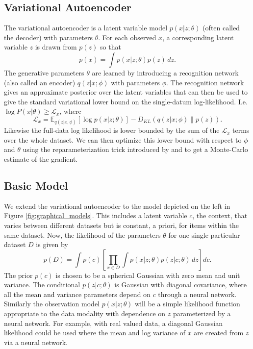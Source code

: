 \documentclass{article} \usepackage{iclr2017_conference,times}
\newcommand{\KL}[2]{D_{KL} \left (#1 \| #2 \right )}
\begin{document}
\subsection{Variational Autoencoder}
The variational autoencoder is a latent variable model $p(x|z;\theta)$ (often called the decoder) with parameters $\theta$. For each observed $x$, a corresponding latent variable $z$ is drawn from $p(z)$ so that
\begin{equation}
    p(x) = \int p(x|z ; \theta) p(z) \, dz .
\end{equation}
The generative parameters $\theta$ are learned by introducing a recognition network (also called an encoder) $q(z | x ;\phi)$ with parameters $\phi$. The recognition network gives an approximate posterior over the latent variables that can then be used to give the standard variational lower bound \citep{saul_variational} on the single-datum log-likelihood. I.e. $\log P(x|\theta) \ge \mathcal{L}_x$, where
\begin{equation}
    \mathcal{L}_x = \mathbb{E}_{q(z | x, \phi)} \left [ \log p(x | z; \theta) \right ] - \KL{q(z | x ; \phi)}{p(z)}.
\end{equation}
Likewise the full-data log likelihood is lower bounded by the sum of the $\mathcal{L}_x$ terms over the whole dataset. We can then optimize this lower bound with respect to $\phi$ and $\theta$ using the reparameterization trick introduced by \citet{variational_autoencoder} and  \citet{reparam_paper} to get a Monte-Carlo estimate of the gradient.


\subsection{Basic Model}
We extend the variational autoencoder to the model depicted on the left in Figure \ref{fig:graphical_models}. This includes a latent variable $c$, the context, that varies between different datasets but is constant, a priori, for items within the same dataset. Now, the likelihood of the parameters $\theta$ for one single particular dataset $D$ is given by
\begin{equation}
    p(D) = \int p(c) \left [ \prod_{x \in D} \int p(x|z; \theta) p(z | c ; \theta) \, dz \right ] dc.
\end{equation}
The prior $p(c)$ is chosen to be a spherical Gaussian with zero mean and unit variance. The conditional $p(z | c ; \theta)$ is Gaussian with diagonal covariance, where all the mean and variance parameters depend on $c$ through a neural network. Similarly the observation model $p(x|z;\theta)$ will be a simple likelihood function appropriate to the data modality with dependence on $z$ parameterized by a neural network. For example, with real valued data, a diagonal Gaussian likelihood could be used where the mean and log variance of $x$ are created from $z$ via a neural network.
\end{document}
